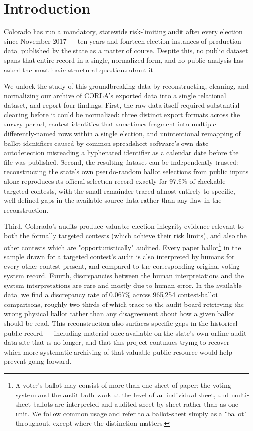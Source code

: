 \section{Introduction}

Colorado has run a mandatory, statewide risk-limiting audit after every
election since November 2017 — ten years and fourteen election instances
of production data, published by the state as a matter of course. Despite
this, no public dataset spans that entire record in a single, normalized
form, and no public analysis has asked the most basic structural questions
about it.

We unlock the study of this groundbreaking data by reconstructing, cleaning, and
normalizing our archive of CORLA's exported data into a single relational
dataset, and report four findings. First, the raw data itself required
substantial cleaning before it could be normalized: three distinct
export formats across the survey period, contest identities that
sometimes fragment into multiple, differently-named rows within a single
election, and unintentional remapping of ballot identifiers caused by common spreadsheet
software's own date-autodetection misreading a hyphenated identifier as a
calendar date before the file was published. Second, the resulting
dataset can be independently trusted: reconstructing the state's own
pseudo-random ballot selections from public inputs alone reproduces its
official selection record exactly for 97.9\% of checkable targeted
contests, with the small remainder traced almost entirely to specific,
well-defined gaps in the available source data rather than any flaw
in the reconstruction.

Third, Colorado's audits produce valuable election integrity
evidence relevant to both the formally targeted contests (which achieve their risk limits),
and also the other contests which are "opportunistically" audited.
Every paper ballot\footnote{A voter's ballot may consist of more than one sheet of paper; the voting system and the audit both work at the level of an individual sheet, and multi-sheet ballots are interpreted and audited sheet by sheet rather than as one unit. We follow common usage and refer to a ballot-sheet simply as a "ballot" throughout, except where the distinction matters.} in the sample drawn for a targeted contest's audit
is also interpreted by humans for every other contest present, and compared to
the corresponding original voting system record.
Fourth, discrepancies between the human interpretations and the system
interpretations are rare and mostly due to human error. In the available data,
we find a discrepancy rate of 0.067\% across 965,254 contest-ballot
comparisons, roughly two-thirds of which trace to the audit board
retrieving the wrong physical ballot rather than any disagreement about
how a given ballot should be read. This reconstruction also surfaces specific gaps in the historical public
record — including material once available on the state's own online audit
data site that is no longer, and that this project continues trying to
recover — which more systematic archiving of that valuable public resource
would help prevent going forward.

